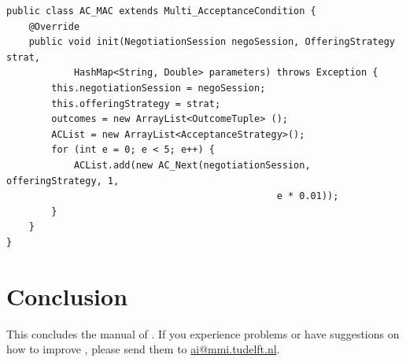 \documentclass[]{article}
\begin{document}
\begin{lstlisting}
public class AC_MAC extends Multi_AcceptanceCondition {
	@Override
	public void init(NegotiationSession negoSession, OfferingStrategy strat, 
			HashMap<String, Double> parameters) throws Exception {
		this.negotiationSession = negoSession;
		this.offeringStrategy = strat;
		outcomes = new ArrayList<OutcomeTuple> ();
		ACList = new ArrayList<AcceptanceStrategy>();
		for (int e = 0; e < 5; e++) {
			ACList.add(new AC_Next(negotiationSession, offeringStrategy, 1, 
												e * 0.01));
		}
	}
}

\end{lstlisting}

\section{Conclusion}
This concludes the manual of \Genius. If you experience problems or have suggestions on how to improve \Genius, please send them to \url{ai@mmi.tudelft.nl}.


%
%
\end{document}
